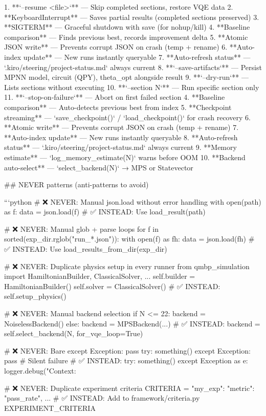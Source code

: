 1. **`--resume <file>`** — Skip completed sections, restore VQE data
2. **KeyboardInterrupt** — Saves partial results (completed sections preserved)
3. **SIGTERM** — Graceful shutdown with save (for nohup/kill)
4. **Baseline comparison** — Finds previous best, records improvement delta
5. **Atomic JSON write** — Prevents corrupt JSON on crash (temp + rename)
6. **Auto-index update** — New runs instantly queryable
7. **Auto-refresh status** — `.kiro/steering/project-status.md` always current
8. **`--save-artifacts`** — Persist MPNN model, circuit (QPY), theta_opt alongside result
9. **`--dry-run`** — Lists sections without executing
10. **`--section N`** — Run specific section only
11. **`--stop-on-failure`** — Abort on first failed section
4. **Baseline comparison** — Auto-detects previous best from index
5. **Checkpoint streaming** — `save_checkpoint()` / `load_checkpoint()` for crash recovery
6. **Atomic write** — Prevents corrupt JSON on crash (temp + rename)
7. **Auto-index update** — New runs instantly queryable
8. **Auto-refresh status** — `.kiro/steering/project-status.md` always current
9. **Memory estimate** — `log_memory_estimate(N)` warns before OOM
10. **Backend auto-select** — `select_backend(N)` → MPS or Statevector

## NEVER patterns (anti-patterns to avoid)

```python
# ❌ NEVER: Manual json.load without error handling
with open(path) as f:
    data = json.load(f)
# ✅ INSTEAD: Use load_result(path)

# ❌ NEVER: Manual glob + parse loops
for f in sorted(exp_dir.rglob("run_*.json")):
    with open(f) as fh:
        data = json.load(fh)
# ✅ INSTEAD: Use load_results_from_dir(exp_dir)

# ❌ NEVER: Duplicate physics setup in every runner
from qmbp_simulation import HamiltonianBuilder, ClassicalSolver, ...
self.builder = HamiltonianBuilder()
self.solver = ClassicalSolver()
# ✅ INSTEAD: self.setup_physics()

# ❌ NEVER: Manual backend selection
if N <= 22:
    backend = NoiselessBackend()
else:
    backend = MPSBackend(...)
# ✅ INSTEAD: backend = self.select_backend(N, for_vqe_loop=True)

# ❌ NEVER: Bare except Exception: pass
try:
    something()
except Exception:
    pass  # Silent failure
# ✅ INSTEAD:
try:
    something()
except Exception as e:
    logger.debug("Context: %

# ❌ NEVER: Duplicate experiment criteria
CRITERIA = {"my_exp": {"metric": "pass_rate", ...}}
# ✅ INSTEAD: Add to framework/criteria.py EXPERIMENT_CRITERIA

